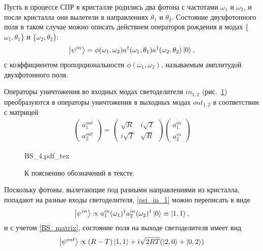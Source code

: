 \documentclass[12pt,a5paper]{article}
\numberwithin{equation}{section}
\newcommand{\incfig}[1]{%
    \def\svgwidth{\columnwidth}
    {#1.pdf_tex}
}
\begin{document}
Пусть в процессе СПР в кристалле родились два фотона с частотами $\omega_1$ и $\omega_2$, и после кристалла они вылетели в направлениях $\theta_1$ и $\theta_2$. Состояние двухфотонного поля в таком случае можно описать действием операторов рождения в модах \{$\omega_1, \theta_1$\} и \{$\omega_2, \theta_2$\}:
\begin{gather}
    \ket{\psi^{in}}=\phi(\omega_1, \omega_2)a^{\dagger}(\omega_1, \theta_1) a^{\dagger}(\omega_2, \theta_2)\ket{0},  \label{psi_in_1}
 \end{gather}
с коэффициентом пропорциональности $\phi(\omega_1, \omega_2)$, называемым амплитудой двухфотонного поля.

Операторы уничтожения во входных модах светоделителя $in_{1,2}$ (рис.~\ref{fig:BS}) преобразуются в операторы уничтожения в выходных модах $out_{1,2}$ в соответствии с матрицей
\begin{gather}
   \begin{pmatrix}
    a^{out}_1 \\ a^{out}_2
   \end{pmatrix} =
    \begin{pmatrix}
        \sqrt{R} & i\sqrt{T} \\
        i\sqrt{T} & \sqrt{R}
    \end{pmatrix}
   \begin{pmatrix}
    a^{in}_1 \\ a^{in}_2
   \end{pmatrix} \label{BS_matrix}
\end{gather}


\begin{figure}[]
    \centering
    \incfig{BS_4}
    \caption{К пояснению обозначений в тексте.}
    \label{fig:BS}
\end{figure}


Поскольку фотоны, вылетающие под разными направлениями из кристалла, попадают на разные входы светоделителя, \ref{psi_in_1} можно переписать в виде
\begin{gather}
    \ket{\psi^{in}}\propto a^{ in}_1 (\omega_1) ^ \dagger a^{in}_2 (\omega_2) ^ \dagger\ket{0}\equiv\ket{1,1}, \label{psi_in_2}
\end{gather}
и с учетом \ref{BS_matrix}, состояние поля на выходе светоделителя имеет вид
\begin{gather}
    \ket{\psi^{out}}\propto (R-T)\ket{1,1} + i\sqrt{2RT} (\ket{2,0}+\ket{0,2})
     \label{psi_out}
\end{gather}
\end{document}

